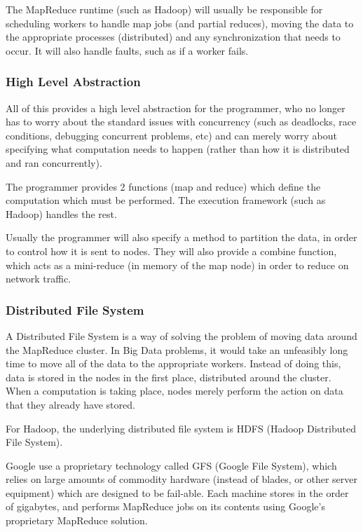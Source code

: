 \documentclass{article}
\begin{document}
The MapReduce runtime (such as Hadoop) will usually be responsible for scheduling workers to handle map jobs (and partial reduces), moving the data to the appropriate processes (distributed) and any synchronization that needs to occur. It will also handle faults, such as if a worker fails. 

\subsubsection{High Level Abstraction}
All of this provides a high level abstraction for the programmer, who no longer has to worry about the standard issues with concurrency (such as deadlocks, race conditions, debugging concurrent problems, etc) and can merely worry about specifying what computation needs to happen (rather than how it is distributed and ran concurrently). 

The programmer provides 2 functions (map and reduce) which define the computation which must be performed. The execution framework (such as Hadoop) handles the rest. 

Usually the programmer will also specify a method to partition the data, in order to control how it is sent to nodes. They will also provide a combine function, which acts as a mini-reduce (in memory of the map node) in order to reduce on network traffic.

\subsubsection{Distributed File System}
A Distributed File System is a way of solving the problem of moving data around the MapReduce cluster. In Big Data problems, it would take an unfeasibly long time to move all of the data to the appropriate workers. Instead of doing this, data is stored in the nodes in the first place, distributed around the cluster. When a computation is taking place, nodes merely perform the action on data that they already have stored. 

For Hadoop, the underlying distributed file system is HDFS (Hadoop Distributed File System). 

Google use a proprietary technology called GFS (Google File System), which relies on large amounts of commodity hardware (instead of blades, or other server equipment) which are designed to be fail-able. Each machine stores in the order of gigabytes, and performs MapReduce jobs on its contents using Google's proprietary MapReduce solution.
\end{document}
